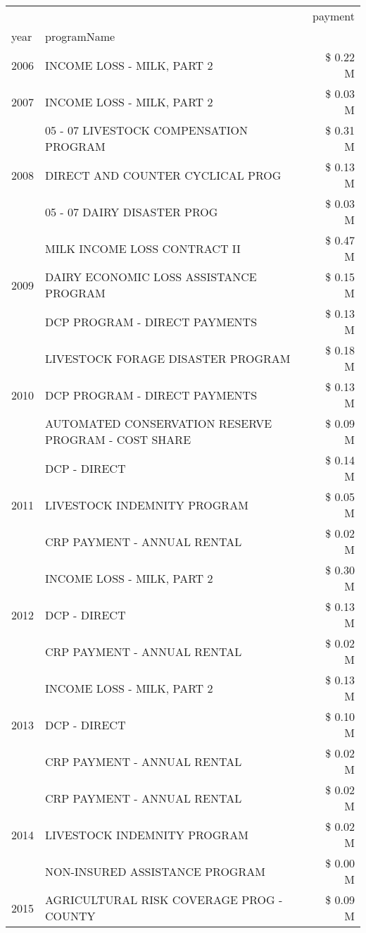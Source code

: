 \begin{tabular}{llr}
\toprule
 &  & payment \\
year & programName &  \\
\midrule
2006 & INCOME LOSS - MILK, PART 2 & \$ 0.22 M \\
\cline{1-3}
2007 & INCOME LOSS - MILK, PART 2 & \$ 0.03 M \\
\cline{1-3}
\multirow[t]{3}{*}{2008} & 05 - 07 LIVESTOCK COMPENSATION PROGRAM & \$ 0.31 M \\
 & DIRECT AND COUNTER CYCLICAL PROG & \$ 0.13 M \\
 & 05 - 07 DAIRY DISASTER PROG & \$ 0.03 M \\
\cline{1-3}
\multirow[t]{3}{*}{2009} & MILK INCOME LOSS CONTRACT II & \$ 0.47 M \\
 & DAIRY ECONOMIC LOSS ASSISTANCE PROGRAM & \$ 0.15 M \\
 & DCP PROGRAM - DIRECT PAYMENTS & \$ 0.13 M \\
\cline{1-3}
\multirow[t]{3}{*}{2010} & LIVESTOCK FORAGE DISASTER  PROGRAM & \$ 0.18 M \\
 & DCP PROGRAM - DIRECT PAYMENTS & \$ 0.13 M \\
 & AUTOMATED CONSERVATION RESERVE PROGRAM - COST SHARE & \$ 0.09 M \\
\cline{1-3}
\multirow[t]{3}{*}{2011} & DCP - DIRECT & \$ 0.14 M \\
 & LIVESTOCK INDEMNITY PROGRAM & \$ 0.05 M \\
 & CRP PAYMENT - ANNUAL RENTAL & \$ 0.02 M \\
\cline{1-3}
\multirow[t]{3}{*}{2012} & INCOME LOSS - MILK, PART 2 & \$ 0.30 M \\
 & DCP - DIRECT & \$ 0.13 M \\
 & CRP PAYMENT - ANNUAL RENTAL & \$ 0.02 M \\
\cline{1-3}
\multirow[t]{3}{*}{2013} & INCOME LOSS - MILK, PART 2 & \$ 0.13 M \\
 & DCP - DIRECT & \$ 0.10 M \\
 & CRP PAYMENT - ANNUAL RENTAL & \$ 0.02 M \\
\cline{1-3}
\multirow[t]{3}{*}{2014} & CRP PAYMENT - ANNUAL RENTAL & \$ 0.02 M \\
 & LIVESTOCK INDEMNITY PROGRAM & \$ 0.02 M \\
 & NON-INSURED ASSISTANCE PROGRAM & \$ 0.00 M \\
\cline{1-3}
\multirow[t]{3}{*}{2015} & AGRICULTURAL RISK COVERAGE PROG - COUNTY & \$ 0.09 M \\

\end{tabular}
